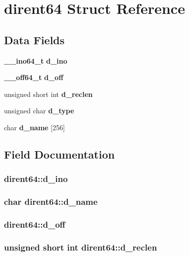 \section{dirent64 Struct Reference}
\label{structdirent64}
\subsection*{Data Fields}
\begin{DoxyCompactItemize}
\item 
{\bf \_\-\_\-ino64\_\-t} {\bf d\_\-ino}
\item 
{\bf \_\-\_\-off64\_\-t} {\bf d\_\-off}
\item 
unsigned short int {\bf d\_\-reclen}
\item 
unsigned char {\bf d\_\-type}
\item 
char {\bf d\_\-name} [256]
\end{DoxyCompactItemize}


\subsection{Field Documentation}
\subsubsection[{d\_\-ino}]{ {\bf dirent64::d\_\-ino}}\label{structdirent64_ac187e13572f569e777752bd993a28684}
\subsubsection[{d\_\-name}]{\setlength{\rightskip}{0pt plus 5cm}char {\bf dirent64::d\_\-name}}\label{structdirent64_a6e94b2e045483ad211388564bcc875d6}
\subsubsection[{d\_\-off}]{ {\bf dirent64::d\_\-off}}\label{structdirent64_a79af2cc956ef9d991968137afde025c4}
\subsubsection[{d\_\-reclen}]{\setlength{\rightskip}{0pt plus 5cm}unsigned short int {\bf dirent64::d\_\-reclen}}\label{structdirent64_a78c044ed5fdb7e99be431d4770fe050f}
